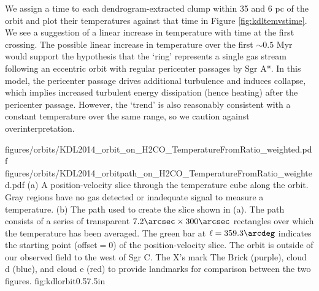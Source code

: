 We assign a time to each dendrogram-extracted clump within 35 \kms and 6 pc of
the \citet{Kruijssen2015a} orbit and plot their temperatures against that time
in Figure \ref{fig:kdltemvstime}.  We see a suggestion of a linear increase in temperature
with time at the first crossing.  The possible linear increase in temperature
over the first $\sim0.5$ Myr would support the \citet{Kruijssen2015a} hypothesis
that the `ring' represents a single gas stream following an eccentric orbit
with regular pericenter passages by Sgr A*.
In this model, the pericenter passage drives additional turbulence and induces
collapse, which implies increased turbulent energy dissipation (hence heating)
after the pericenter passage.  However, the `trend' is also reasonably
consistent with a constant temperature over the same range, so we caution
against overinterpretation. 

\RotFigureTwoAA
{figures/orbits/KDL2014_orbit_on_H2CO_TemperatureFromRatio_weighted.pdf}
{figures/orbits/KDL2014_orbitpath_on_H2CO_TemperatureFromRatio_weighted.pdf}
{(a) A position-velocity slice through the temperature cube along the
\citet{Kruijssen2015a} orbit.  
Gray regions have no gas detected or inadequate signal to measure a
temperature.
(b) The path used to create the slice shown in (a).  The path consists of a series
of transparent $7.2\arcsec\times300\arcsec$
rectangles over which the temperature has been averaged.  The green bar at
$\ell=359.3\arcdeg$ indicates the starting point (offset$=0$) of the position-velocity
slice.  The orbit is outside of our observed field to the west of Sgr C.  
The X's mark The Brick (purple), cloud d (blue), and cloud e (red) to provide
landmarks for comparison between the two figures.
}
{fig:kdlorbit}{0.5}{7.5in}

